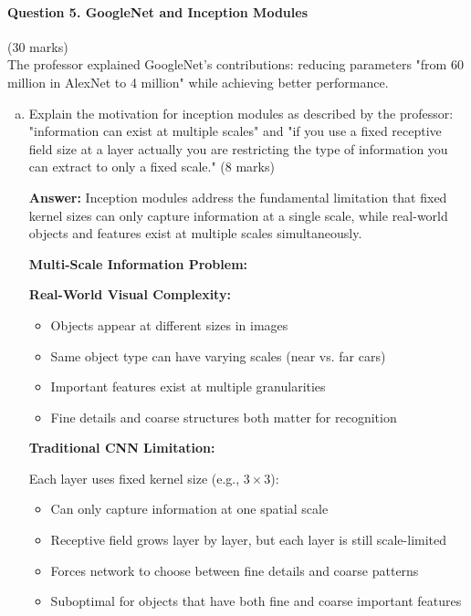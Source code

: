 \documentclass[12pt]{article}
\newcommand{\answer}[1]{{\color{answercolor}\textbf{Answer:} #1}}
\newcommand{\explanation}[1]{{\color{explanationcolor}#1}}
\begin{document}
\newpage
\paragraph{Question 5. GoogleNet and Inception Modules}{\hfill (30 marks)}\\
The professor explained GoogleNet's contributions: reducing parameters "from 60 million in AlexNet to 4 million" while achieving better performance.

\begin{enumerate}[(a)]
    \item Explain the motivation for inception modules as described by the professor: "information can exist at multiple scales" and "if you use a fixed receptive field size at a layer actually you are restricting the type of information you can extract to only a fixed scale." \hfill (8 marks)
    
    \answer{Inception modules address the fundamental limitation that fixed kernel sizes can only capture information at a single scale, while real-world objects and features exist at multiple scales simultaneously.}
    
    \explanation{
    \textbf{Multi-Scale Information Problem:}
    
    \textbf{Real-World Visual Complexity:}
    \begin{itemize}
        \item Objects appear at different sizes in images
        \item Same object type can have varying scales (near vs. far cars)
        \item Important features exist at multiple granularities
        \item Fine details and coarse structures both matter for recognition
    \end{itemize}
    
    \textbf{Traditional CNN Limitation:}
    
    Each layer uses fixed kernel size (e.g., $3 \times 3$):
    \begin{itemize}
        \item Can only capture information at one spatial scale
        \item Receptive field grows layer by layer, but each layer is still scale-limited
        \item Forces network to choose between fine details and coarse patterns
        \item Suboptimal for objects that have both fine and coarse important features
    \end{itemize}
    
}
\end{enumerate}
\end{document}
